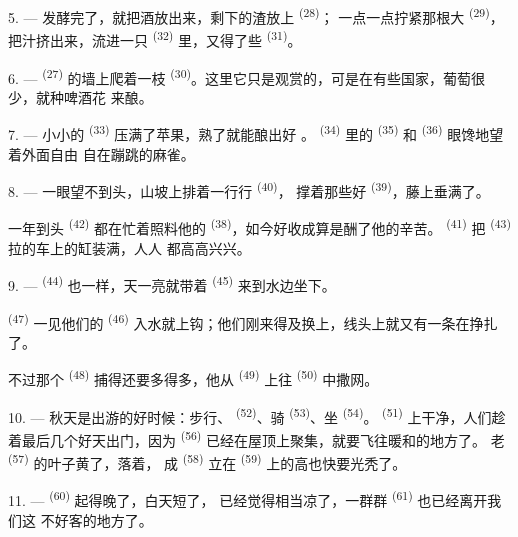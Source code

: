 5. --- 发酵完了，就把酒放出来，剩下的渣放上 \textsuperscript{(28)}；
一点一点拧紧那根大 \textsuperscript{(29)}，把汁挤出来，流进一只
 \textsuperscript{(32)} 里，又得了些 \textsuperscript{(31)}。

\VUsaut{6.0mm}
\VUsaut{3.4mm}

6. ---  \textsuperscript{(27)} 的墙上爬着一枝
\textsuperscript{(30)}。这里它只是观赏的，可是在有些国家，葡萄很少，就种啤酒花
来酿。

7. --- 小小的 \textsuperscript{(33)} 压满了苹果，熟了就能酿出好
。 \textsuperscript{(34)} 里的
\textsuperscript{(35)} 和 \textsuperscript{(36)} 眼馋地望着外面自由
自在蹦跳的麻雀。

8. --- 一眼望不到头，山坡上排着一行行 \textsuperscript{(40)}，
撑着那些好 \textsuperscript{(39)}，藤上垂满了。

一年到头 \textsuperscript{(42)} 都在忙着照料他的
\textsuperscript{(38)}，如今好收成算是酬了他的辛苦。
\textsuperscript{(41)} 把 \textsuperscript{(43)} 拉的车上的缸装满，人人
都高高兴兴。

\VUsaut{5.0mm}
\VUsaut{3.4mm}

9. ---  \textsuperscript{(44)} 也一样，天一亮就带着
\textsuperscript{(45)} 来到水边坐下。

 \textsuperscript{(47)} 一见他们的 \textsuperscript{(46)}
入水就上钩；他们刚来得及换上，线头上就又有一条在挣扎了。

不过那个 \textsuperscript{(48)} 捕得还要多得多，他从
 \textsuperscript{(49)} 上往 \textsuperscript{(50)} 中撒网。

10. --- 秋天是出游的好时候：步行、 \textsuperscript{(52)}、骑
 \textsuperscript{(53)}、坐 \textsuperscript{(54)}。
 \textsuperscript{(51)} 上干净，人们趁着最后几个好天出门，因为
 \textsuperscript{(56)} 已经在屋顶上聚集，就要飞往暖和的地方了。
老 \textsuperscript{(57)} 的叶子黄了，落着，
成 \textsuperscript{(58)} 立在 \textsuperscript{(59)}
上的高也快要光秃了。

11. ---  \textsuperscript{(60)} 起得晚了，白天短了，
已经觉得相当凉了，一群群 \textsuperscript{(61)} 也已经离开我们这
不好客的地方了。
\VUsaut{6.0mm}
\VUfilet{22mm}
